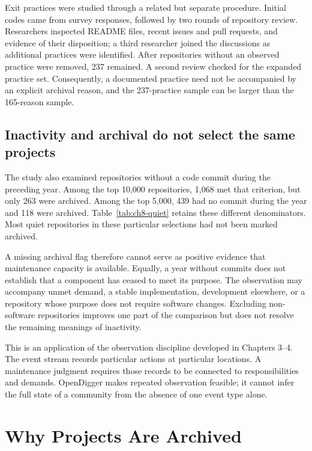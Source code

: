 Exit practices were studied through a related but separate procedure. Initial codes came from survey responses, followed by two rounds of repository review. Researchers inspected README files, recent issues and pull requests, and evidence of their disposition; a third researcher joined the discussions as additional practices were identified. After repositories without an observed practice were removed, 237 remained. A second review checked for the expanded practice set. Consequently, a documented practice need not be accompanied by an explicit archival reason, and the 237-practice sample can be larger than the 165-reason sample.

\subsection{Inactivity and archival do not select the same projects}
The study also examined repositories without a code commit during the preceding year. Among the top 10,000 repositories, 1,068 met that criterion, but only 263 were archived. Among the top 5,000, 439 had no commit during the year and 118 were archived. Table~\ref{tab:ch8-quiet} retains these different denominators. Most quiet repositories in these particular selections had not been marked archived.



A missing archival flag therefore cannot serve as positive evidence that maintenance capacity is available. Equally, a year without commits does not establish that a component has ceased to meet its purpose. The observation may accompany unmet demand, a stable implementation, development elsewhere, or a repository whose purpose does not require software changes. Excluding non-software repositories improves one part of the comparison but does not resolve the remaining meanings of inactivity.

This is an application of the observation discipline developed in Chapters 3--4. The event stream records particular actions at particular locations. A maintenance judgment requires those records to be connected to responsibilities and demands. OpenDigger makes repeated observation feasible; it cannot infer the full state of a community from the absence of one event type alone.

\section{Why Projects Are Archived}
\label{sec:ch8-reasons}

